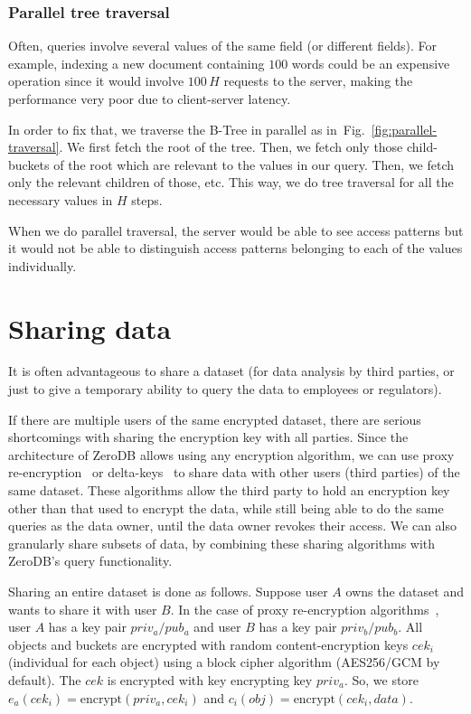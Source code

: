 \documentclass[notitlepage,longbibliography]{revtex4-1}
\newcommand{\figref}[1]{Fig.~\ref{#1}}
\begin{document}
\subsubsection{Parallel tree traversal}
\label{sec:parallel-traversal}

Often, queries involve several values of the same field (or different fields).
For example, indexing a new document containing $100$ words could be an expensive operation since it would involve $100\,H$ requests to the server,
making the performance very poor due to client-server latency.

In order to fix that, we traverse the B-Tree in parallel as in~\figref{fig:parallel-traversal}.
We first fetch the root of the tree.
Then, we fetch only those child-buckets of the root which are relevant to the values in our query.
Then, we fetch only the relevant children of those, etc.
This way, we do tree traversal for all the necessary values in $H$ steps.

When we do parallel traversal, the server would be able to see access patterns but it would not be able to distinguish access patterns belonging to each of the values individually.

\section{Sharing data}

It is often advantageous to share a dataset (for data analysis by third parties,
or just to give a temporary ability to query the data to employees or regulators).

If there are multiple users of the same encrypted dataset, there are serious shortcomings with sharing the encryption key with all parties.
Since the architecture of ZeroDB allows using any encryption algorithm, we can use proxy re-encryption~\cite{afgh,libert2011unidirectional}
or delta-keys~\cite{delta-keys,mylar} to share data with other users (third parties) of the same dataset.
These algorithms allow the third party to hold an encryption key other than that used to encrypt the data,
while still being able to do the same queries as the data owner, until the data owner revokes their access.
We can also granularly share subsets of data, by combining these sharing algorithms with ZeroDB's query functionality.

Sharing an entire dataset is done as follows.
Suppose user $A$ owns the dataset and wants to share it with user $B$.
In the case of proxy re-encryption algorithms~\cite{afgh,libert2011unidirectional}, user $A$ has a key pair $priv_a/pub_a$ and user $B$ has a key pair $priv_b/pub_b$.
All objects and buckets are encrypted with random content-encryption keys $cek_i$ (individual for each object) using a block cipher algorithm (AES256/GCM by default).
The $cek$ is encrypted with key encrypting key $priv_a$.
So, we store $e_a(cek_i) = \mbox{encrypt}(priv_a, cek_i)$ and $c_i(obj) = \mbox{encrypt}(cek_i, data)$.
\end{document}
